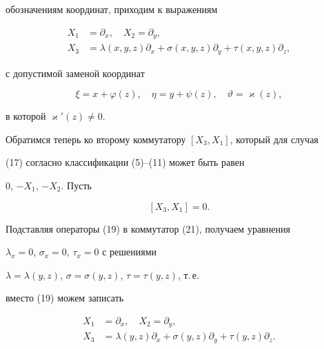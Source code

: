 обозначениям координат, приходим к выражениям 


\begin{equation} 


\begin{split} 


X_1&=\partial_x,\quad X_2=\partial_y,\\ 


X_3&=\lambda(x,y,z)\partial_x+\sigma(x,y,z)\partial_y+ 


\tau(x,y,z)\partial_z, 


\end{split} 


\end{equation} 


с допустимой заменой координат 


\begin{equation} 


\xi=x+\varphi(z),\quad \eta=y+\psi(z),\quad \vartheta=\varkappa(z), 


\end{equation} 


в которой $\varkappa'(z)\ne 0$. 


 


Обратимся теперь ко второму коммутатору $[X_3,X_1]$, который для случая 


(17) согласно классификации (5)--(11) может быть равен 


0, $-X_1$, $-X_2$. Пусть 


\begin{equation} 


[X_3,X_1]=0. 


\end{equation} 


Подставляя операторы (19) в коммутатор (21), получаем уравнения 


$\lambda_x=0$, $\sigma_x=0$, $\tau_x=0$ с решениями 


$\lambda=\lambda(y,z)$, $\sigma=\sigma(y,z)$, $\tau=\tau(y,z)$, т.\,е. 


вместо (19) можем записать 


\begin{equation} 


\begin{split} 


X_1&=\partial_x,\quad X_2=\partial_y,\\ 


X_3&=\lambda(y,z)\partial_x+\sigma(y,z)\partial_y+ 


\tau(y,z)\partial_z. 


\end{split} 


\end{equation} 


